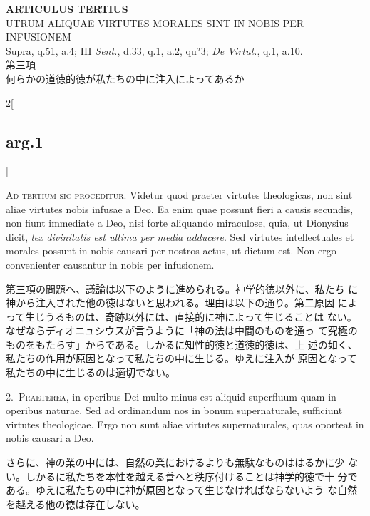 \documentclass[paper=a4paper,fontsize=10pt,jafontsize=9pt,titlepage]{jlreq}
\begin{document}
\begin{center}
{\Large {\bfseries ARTICULUS TERTIUS}}\\
{\large UTRUM ALIQUAE VIRTUTES MORALES SINT IN NOBIS PER INFUSIONEM}\\
{\footnotesize Supra, q.51, a.4; III {\itshape Sent.}, d.33, q.1, a.2, qu$^{a}$3; {\itshape De Virtut.}, q.1, a.10.}\\
{\Large 第三項\\何らかの道徳的徳が私たちの中に注入によってあるか}
\end{center}

\begin{paracol}{2}[\subsection{arg.1}]

{\scshape Ad tertium sic proceditur}. Videtur quod praeter virtutes
theologicas, non sint aliae virtutes nobis infusae a Deo. Ea enim quae
possunt fieri a causis secundis, non fiunt immediate a Deo, nisi forte
aliquando miraculose, quia, ut Dionysius dicit, {\itshape lex
divinitatis est ultima per media adducere}. Sed virtutes
intellectuales et morales possunt in nobis causari per nostros actus,
ut dictum est. Non ergo convenienter causantur in nobis per
infusionem.

\switchcolumn

第三項の問題へ、議論は以下のように進められる。神学的徳以外に、私たち
 に神から注入された他の徳はないと思われる。理由は以下の通り。第二原因
 によって生じうるものは、奇跡以外には、直接的に神によって生じることは
 ない。なぜならディオニュシウスが言うように「神の法は中間のものを通っ
 て究極のものをもたらす」からである。しかるに知性的徳と道徳的徳は、上
 述の如く、私たちの作用が原因となって私たちの中に生じる。ゆえに注入が
 原因となって私たちの中に生じるのは適切でない。


2.~{\scshape Praeterea}, in operibus Dei multo minus est aliquid
superfluum quam in operibus naturae. Sed ad ordinandum nos in bonum
supernaturale, sufficiunt virtutes theologicae. Ergo non sunt aliae
virtutes supernaturales, quas oporteat in nobis causari a Deo.

\switchcolumn

さらに、神の業の中には、自然の業におけるよりも無駄なものははるかに少
 ない。しかるに私たちを本性を越える善へと秩序付けることは神学的徳で十
 分である。ゆえに私たちの中に神が原因となって生じなければならないよう
 な自然を越える他の徳は存在しない。


\end{paracol}
\end{document}

